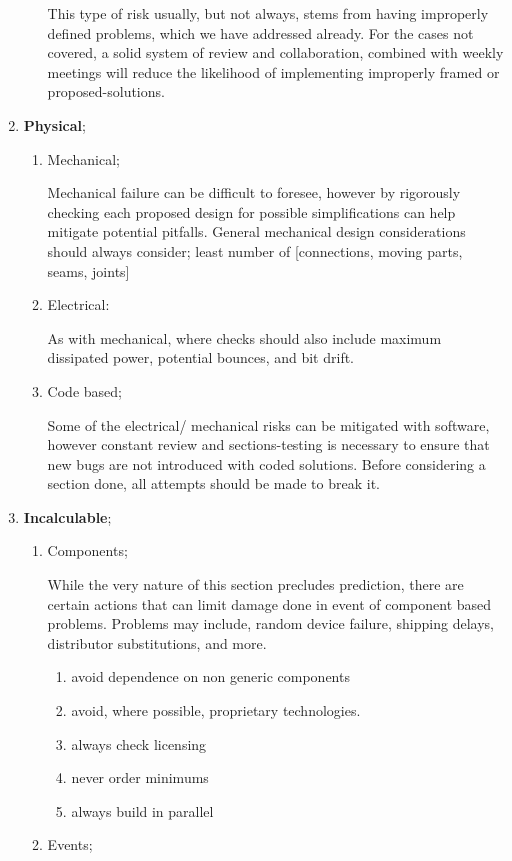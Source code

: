 \begin{enumerate}
\begin{enumerate}
  This type of risk usually, but not always, stems from having improperly defined problems, which we have  addressed already. For the cases not covered, a solid system of review and collaboration, combined with weekly meetings will reduce the likelihood of implementing improperly framed or proposed-solutions.

  \end{enumerate}
  \item \textbf{Physical};
  \begin{enumerate}
  \item Mechanical;

  Mechanical failure can be difficult to foresee, however by rigorously checking each proposed design for possible simplifications can help mitigate potential pitfalls. General mechanical design considerations should always consider; least number of [connections, moving parts, seams, joints]
  \item Electrical:

  As with mechanical, where checks should also include maximum dissipated power, potential bounces, and bit drift.
  \item Code based;

  Some of the electrical/ mechanical risks can be mitigated with software, however constant review and sections-testing is necessary to ensure that new bugs are not introduced with coded solutions.  Before considering a section done, all attempts should be made to break it.


  \end{enumerate}
  \item \textbf{Incalculable};
  \begin{enumerate}
  \item Components;

  While the very nature of this section precludes prediction, there are certain actions that can limit damage done in event of component based problems. Problems may include, random device failure, shipping delays, distributor substitutions, and more.
  \begin{enumerate}
  \item avoid dependence on non generic components
  \item avoid, where possible, proprietary technologies.
  \item always check licensing
  \item never order minimums
  \item always build in parallel
  \end{enumerate}
  \item Events;


\end{enumerate}
\end{enumerate}
